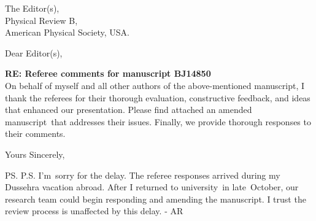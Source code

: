 \documentclass[a4paper, 10pt]{letter}
\begin{document}
	
	\begin{letter}
		{
			The Editor(s),\\
			Physical Review B,\\
			American Physical Society, USA.
		}
		
		\opening{Dear Editor(s),}
		\bigskip
		\textbf{RE: Referee comments for manuscript BJ14850}
		\bigskip\noindent\\
	On behalf of myself and all other authors of the above-mentioned manuscript, I thank the referees for their thorough evaluation, constructive feedback, and ideas that enhanced our presentation. Please find attached an amended manuscript that addresses their issues. Finally, we provide thorough responses to their comments.	
		
		\closing{Yours Sincerely,}



\ps
P.S. I'm sorry for the delay. The referee responses arrived during my Dussehra vacation abroad. After I returned to university in late October, our research team could begin responding and amending the manuscript. I trust the review process is unaffected by this delay. - AR



		
	\end{letter}
\end{document}
